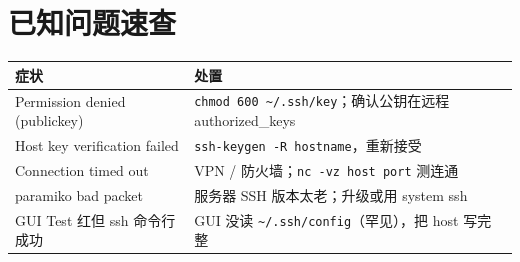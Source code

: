\section{已知问题速查}

\begin{longtable}{p{4cm} p{8.5cm}}
  \toprule
  症状 & 处置 \\
  \midrule
  \endhead
  Permission denied (publickey) & \texttt{chmod 600 \~{}/.ssh/key}；确认公钥在远程 authorized\_keys \\
  Host key verification failed & \texttt{ssh-keygen -R hostname}，重新接受 \\
  Connection timed out & VPN / 防火墙；\texttt{nc -vz host port} 测连通 \\
  paramiko bad packet & 服务器 SSH 版本太老；升级或用 system ssh \\
  GUI Test 红但 ssh 命令行成功 & GUI 没读 \texttt{\~{}/.ssh/config}（罕见），把 host 写完整 \\
  \bottomrule
\end{longtable}
